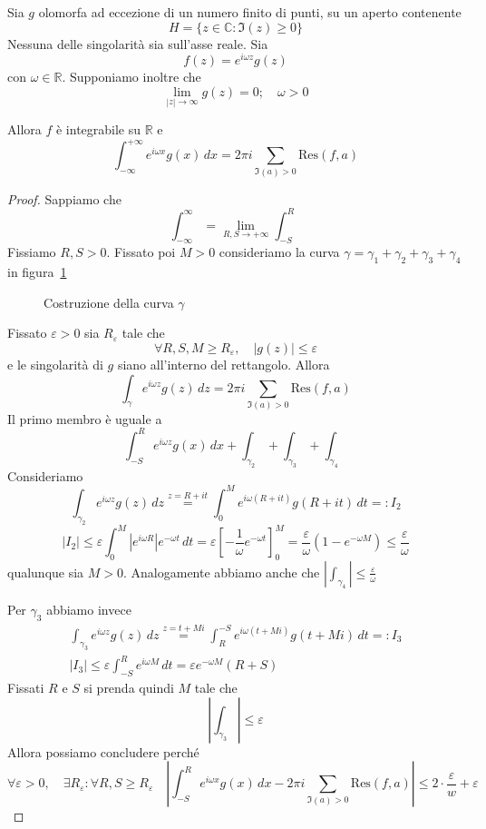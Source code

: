 \begin{theorem}
    Sia \(g\) olomorfa ad eccezione di un numero finito di punti, su un aperto
    contenente 
    \[
      H = \{z \in \mathbb{C} : \Im(z)\ge  0\} 
    \]
    Nessuna delle singolarità sia sull'asse reale. Sia 
    \[
      f{(z)} = e^{i\omega z}g{(z)}
    \]
    con \(\omega \in \mathbb{R}\). Supponiamo inoltre che
    \[
      \lim_{|z| \to \infty} g{(z)} = 0 ; \quad \omega > 0
    \]

    Allora \(f\) è integrabile su \(\mathbb{R}\) e 
    \[
      \int _{-\infty} ^{+\infty}e^{i\omega x}g{(x)} \,dx = 2\pi i \sum_{\Im(a) >
      0} \mathrm{Res} (f, a)
    \]
\end{theorem}
\begin{proof}
    Sappiamo che
    \[
        \int_{-\infty}^{\infty} = \lim_{R, S \to +\infty} \int_{-S}^{R}
    \]
    Fissiamo \(R, S > 0\). Fissato poi \(M > 0\) consideriamo la curva \(\gamma
    = \gamma_{1} + \gamma_{2} + \gamma_{3} + \gamma_{4}\) in
    figura~\ref{fig:curva-della-dim}
\begin{figure}[ht]
    \centering
    \caption{Costruzione della curva \(\gamma\) }\label{fig:curva-della-dim}
\end{figure}

    Fissato \(\varepsilon>0\) sia \(R_\varepsilon\) tale che 
    \[
      \forall R, S, M \ge R_\varepsilon, \quad |g{(z)}| \le \varepsilon
    \]
    e le singolarità di \(g\) siano all'interno del rettangolo.
    Allora 
    \[
        \int _{\gamma} e^{i\omega z}g{(z)} \,dz = 2\pi i \sum_{\Im(a) > 0}
        \mathrm{Res} (f, a)
    \]
    Il primo membro è uguale a 
    \[
        \int_{-S}^{R} e^{i\omega z}g{(x)} \,dx + \int _{\gamma_{2}} + \int
        _{\gamma_{3}} + \int _{\gamma_{4} }
    \]
    Consideriamo 
    \[
      \int _{\gamma_{2}} e^{i\omega z}g{(z)} \,dz \overset{z = R + it}{=}
      \int_{0}^{M}e^{i\omega{(R+it)}}g{(R+it)}  \,d t =: I_{2}
    \]
    \[
      |I_{2}| \le \varepsilon \int_{0}^{M} \left| e^{i\omega R} \right|
      e^{-\omega t} \,dt = \varepsilon \left[ -\frac{1}{\omega}e^{-\omega t}
      \right]_0^{M} = \frac{\varepsilon}{\omega} {\left( 1 - e^{-\omega M}
      \right)} \le \frac{\varepsilon}{\omega}
    \]
    qualunque sia \(M> 0\). Analogamente abbiamo anche che \(\left| \int
    _{\gamma_{4}} \right| \le \frac{\varepsilon}{\omega} \) 

    Per \(\gamma_{3}\) abbiamo invece
    \begin{align*}
      \int _{\gamma_{3}} e^{i\omega z}g{(z)} \,dz \overset{z=t+Mi}{=} \int _{R}
      ^{-S}e^{i\omega(t+Mi)}g{(t+Mi)}\,dt =: I_{3} \\
      |I_3| \le \varepsilon \int_{-S}^{R} e^{i\omega M} \,dt = \varepsilon
      e^{-\omega M}{(R+S)} 
    \end{align*}
    Fissati \(R\) e \(S\) si prenda quindi \(M\) tale che
    \[
      \left| \int _{\gamma_{3}} \right| \le \varepsilon
    \]
    Allora possiamo concludere perché
    \[
      \forall \varepsilon > 0,\quad \exists R_\varepsilon : \forall R, S \ge
      R_\varepsilon \quad \left| \int_{-S}^{R} e^{i\omega x}g{(x)} \,dx - 2\pi i
      \sum_{\Im(a) > 0} \mathrm{Res}{(f, a)} \right| \le 2\cdot
      \frac{\varepsilon}{w} + \varepsilon
    \]
\end{proof}
